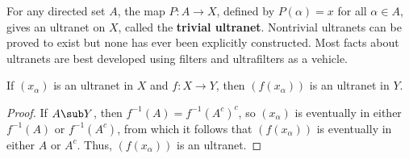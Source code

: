 For any directed set $A$, the map $P:A\to X$, defined by $P(\alpha)=x$ for all $\alpha\in A$, gives an ultranet on $X$, called the \textbf{trivial ultranet}. Nontrivial ultranets can be proved to exist but none has ever been explicitly constructed. Most facts about ultranets are best developed using filters and ultrafilters as a vehicle.
\begin{proposition}
If $(x_\alpha)$ is an ultranet in $X$ and $f:X\to Y$, then $(f(x_\alpha))$ is an ultranet in $Y$.
\end{proposition}
\begin{proof}
If $A\sub Y$, then $f^{-1}(A)=f^{-1}(A^c)^c$, so $(x_\alpha)$ is eventually in either $f^{-1}(A)$ or $f^{-1}(A^c)$, from which it follows that $(f(x_\alpha))$ is eventually in either $A$ or $A^c$. Thus, $(f(x_\alpha))$ is an ultranet.
\end{proof}
